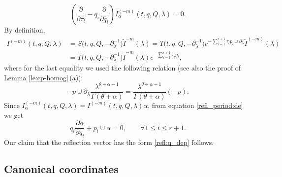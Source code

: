 \documentclass[pdftex]{sigma}
\numberwithin{equation}{section}
\begin{document}
\begin{equation}\label{refl_period:de}
\left(
\frac{\partial}{\partial \tau_i} - q_i\frac{\partial}{\partial q_i}
\right) I^{(-m)}_\alpha(t,q,Q,\lambda) =0.
\end{equation}
By definition,
\begin{align*}
I^{(-m)}(t,q,Q,\lambda)&=
S\big(t,q,Q,-\partial_\lambda^{-1}\big) \widetilde I^{-m}(\lambda)=T\big(t,q,Q,-\partial_\lambda^{-1}\big)
e^{-\sum^{r+1}_{i=1}\tau_i p_i\cup\partial_\lambda} \widetilde I^{(-m)}(\lambda)\\
&=T\big(t,q,Q,-\partial_\lambda^{-1}\big)
\widetilde I^{-m}(\lambda) e^{-\sum^{r+1}_{i=1}\tau_i p_i},
\end{align*}
where for the last equality we used the following relation (see also the proof of Lemma \ref{le:cp-homog}\,(a)):
\[
-p\cup \partial_\lambda
\frac{\lambda^{\theta+\alpha-1}}{\Gamma(\theta+\alpha)} =
\frac{\lambda^{\theta+\alpha-1}}{\Gamma(\theta+\alpha)} (-p).
\]
Since $I_\alpha^{(-m)}(t,q,Q,\lambda) =I^{(-m)}(t,q,Q,\lambda) \alpha$, from equation \eqref{refl_period:de} we get
\[
q_i\frac{\partial \alpha}{\partial q_i} + p_i\cup \alpha =0,\qquad
\forall 1\leq i\leq r+1.
\]
Our claim that the reflection vector has the form \eqref{refl:q_dep} follows.


\subsection{Canonical coordinates}\label{sec:can_coords}
\end{document}
